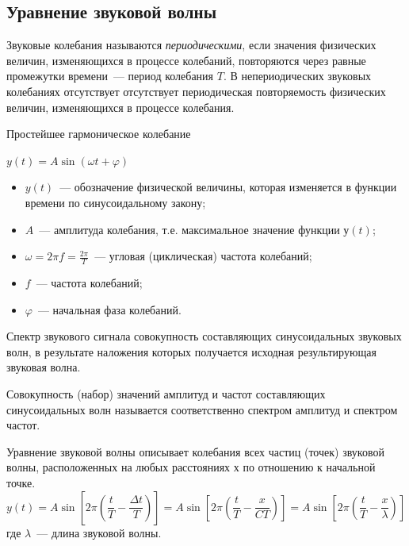 \documentclass{beamer}
\begin{document}
\subsection{Уравнение звуковой волны}
\begin{frame}
Звуковые колебания называются {\itshape периодическими}, если значения физических величин, изменяющихся в процессе колебаний, повторяются через  равные промежутки времени~--- период колебания \(T\). В непериодических звуковых колебаниях отсутствует отсутствует периодическая повторяемость физических величин, изменяющихся в процессе колебания.
\begin{block}{Простейшее гармоническое колебание}
\begin{center}
\(y(t)=A\sin(\omega t+\varphi)\)
\end{center}
\begin{itemize}
\item \(y(t)\)~--- обозначение физической величины, которая изменяется в функции времени по синусоидальному закону;
\item \(A\)~--- амплитуда колебания, т.е. максимальное значение функции \(у(t)\);
\item \(\omega=2\pi f=\frac{2\pi}{T}\)~--- угловая (циклическая) частота колебаний;
\item \(f\)~--- частота колебаний;
\item \(\varphi\)~--- начальная фаза колебаний.
\end{itemize}
\end{block}
\end{frame}  

\begin{frame}
\begin{block}{Спектр звукового сигнала}
совокупность составляющих синусоидальных звуковых волн, в результате наложения которых получается исходная результирующая звуковая волна. 
\end{block}
Совокупность (набор) значений амплитуд и частот составляющих синусоидальных волн называется соответственно спектром амплитуд и спектром частот.
\begin{block}{Уравнение звуковой волны}
описывает колебания всех частиц (точек) звуковой волны, расположенных на любых расстояниях \(х\) по отношению к начальной точке. 
\[y(t) = A\sin[2\pi(\frac{t}{T}-\frac{\Delta t}{T})] = A\sin[2\pi(\frac{t}{T}-\frac{x}{CT})]=A\sin[2\pi(\frac{t}{T}-\frac{x}{\lambda})]\]
где \(\lambda\)~--- длина звуковой волны.
\end{block}
\end{frame}
\end{document}
